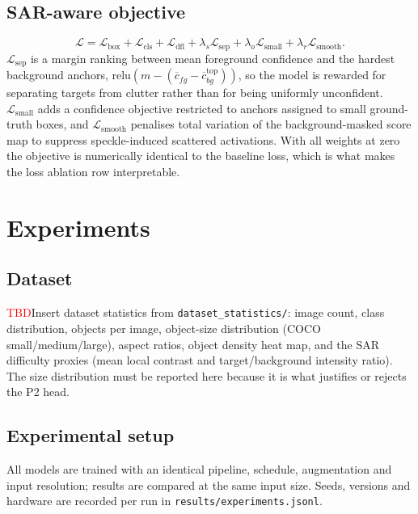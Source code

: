 \documentclass[10pt,twocolumn,letterpaper]{article}
\newcommand{\tbd}{\textcolor{red}{TBD}}
\begin{document}
\subsection{SAR-aware objective}
\begin{equation}
\mathcal{L} = \mathcal{L}_{\mathrm{box}} + \mathcal{L}_{\mathrm{cls}}
+ \mathcal{L}_{\mathrm{dfl}}
+ \lambda_s \mathcal{L}_{\mathrm{sep}}
+ \lambda_o \mathcal{L}_{\mathrm{small}}
+ \lambda_r \mathcal{L}_{\mathrm{smooth}} .
\end{equation}
$\mathcal{L}_{\mathrm{sep}}$ is a margin ranking between mean foreground
confidence and the hardest background anchors,
$\mathrm{relu}(m - (\overline{c}_{fg} - \overline{c}_{bg}^{\text{top}}))$, so the
model is rewarded for separating targets from clutter rather than for being
uniformly unconfident. $\mathcal{L}_{\mathrm{small}}$ adds a confidence
objective restricted to anchors assigned to small ground-truth boxes, and
$\mathcal{L}_{\mathrm{smooth}}$ penalises total variation of the
background-masked score map to suppress speckle-induced scattered activations.
With all weights at zero the objective is numerically identical to the baseline
loss, which is what makes the loss ablation row interpretable.

\section{Experiments}
\label{sec:experiments}

\subsection{Dataset}
\label{sec:dataset}
\tbd{Insert dataset statistics from \texttt{dataset\_statistics/}}: image count,
class distribution, objects per image, object-size distribution (COCO
small/medium/large), aspect ratios, object density heat map, and the SAR
difficulty proxies (mean local contrast and target/background intensity ratio).
The size distribution must be reported here because it is what justifies or
rejects the P2 head.

\subsection{Experimental setup}
All models are trained with an identical pipeline, schedule, augmentation and
input resolution; results are compared at the same input size. Seeds, versions
and hardware are recorded per run in \texttt{results/experiments.jsonl}.
\end{document}

